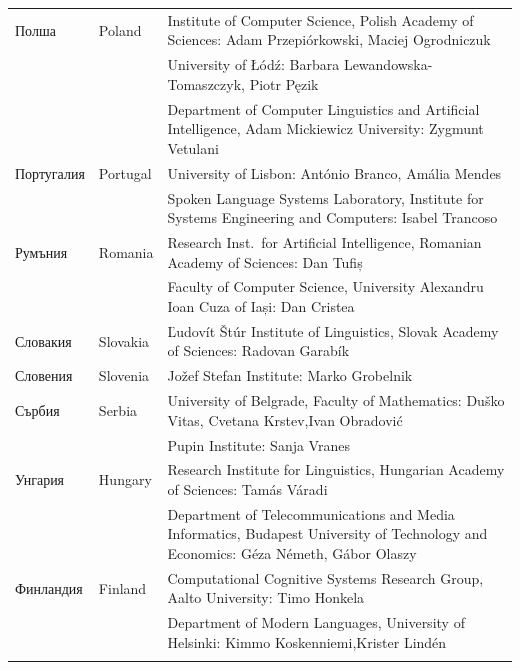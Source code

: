 \begin{longtable}{@{}llp{110mm}@{}}
    Полша & \textcolor{grey1}{Poland} & Institute of Computer Science, Polish Academy of Sciences: Adam Przepiórkowski, Maciej Ogrodniczuk \\ \addlinespace
    & & University of Łódź: Barbara Lewandowska-Tomaszczyk, Piotr Pęzik\\ \addlinespace
    & & Department of Computer Linguistics and Artificial Intelligence, Adam Mickiewicz University: Zygmunt Vetulani \\ \addlinespace
    Португалия & \textcolor{grey1}{Portugal} & University of Lisbon: António Branco, Amália Mendes \\ \addlinespace
    & & Spoken Language Systems Laboratory, Institute for Systems Engineering and Computers: Isabel Trancoso \\ \addlinespace
    Румъния & \textcolor{grey1}{Romania} & Research Inst.~for Artificial Intelligence, Romanian Academy of Sciences: Dan Tufiș \\ \addlinespace
    & & Faculty of Computer Science, University Alexandru Ioan Cuza of
    Iași: Dan Cristea \\ \addlinespace
    Словакия & \textcolor{grey1}{Slovakia} & Ľudovít Štúr Institute of Linguistics, Slovak Academy of Sciences: Radovan Garabík \\ \addlinespace 
    Словения & \textcolor{grey1}{Slovenia} & Jožef Stefan Institute: Marko Grobelnik \\ \addlinespace 
    Сърбия & \textcolor{grey1}{Serbia} & University of Belgrade, Faculty of Mathematics: Duško Vitas, Cvetana Krstev,\newline Ivan Obradović \\ \addlinespace
    & & Pupin Institute: Sanja Vranes \\ \addlinespace  
    Унгария & \textcolor{grey1}{Hungary} & Research Institute for Linguistics, Hungarian Academy of Sciences: Tamás Váradi\\  \addlinespace
    & & Department of Telecommunications and Media Informatics, Budapest University of Technology and Economics: Géza Németh, Gábor Olaszy\\ \addlinespace
    Финландия & \textcolor{grey1}{Finland} & Computational Cognitive
    Systems Research Group, Aalto University: \newline Timo Honkela\\ \addlinespace
    & & Department of Modern Languages, University of Helsinki: Kimmo
    Koskenniemi,\newline Krister Lindén \\ \addlinespace

\end{longtable}

